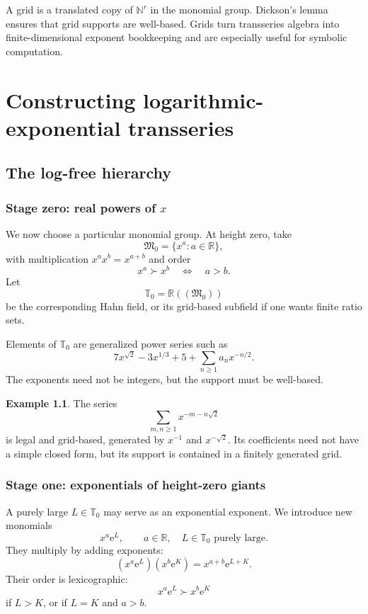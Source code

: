 \documentclass[11pt,oneside]{book}
\theoremstyle{definition}
\newtheorem{example}[theorem]{Example}
\theoremstyle{remark}
\newcommand{\R}{\mathbb{R}}
\newcommand{\N}{\mathbb{N}}
\newcommand{\T}{\mathbb{T}}
\newcommand{\M}{\mathfrak{M}}
\newcommand{\e}{\mathrm{e}}
\newcommand{\succdom}{\succ}
\begin{document}
\begin{summarybox}
A grid is a translated copy of $\N^r$ in the monomial group. Dickson's lemma
ensures that grid supports are well-based. Grids turn transseries algebra into
finite-dimensional exponent bookkeeping and are especially useful for symbolic
computation.
\end{summarybox}


\part{Constructing logarithmic-exponential transseries}

\chapter{The log-free hierarchy}
\label{ch:logfree-hierarchy}

\section{Stage zero: real powers of \texorpdfstring{$x$}{x}}

We now choose a particular monomial group. At height zero, take
\[
  \M_0=\{x^a:a\in\R\},
\]
with multiplication $x^ax^b=x^{a+b}$ and order
\[
  x^a\succdom x^b \quad\Longleftrightarrow\quad a>b.
\]
Let
\[
  \T_0=\R((\M_0))
\]
be the corresponding Hahn field, or its grid-based subfield if one wants finite
ratio sets.

Elements of $\T_0$ are generalized power series such as
\[
  7x^{\sqrt2}-3x^{1/3}+5+\sum_{n\ge1}a_nx^{-n/2}.
\]
The exponents need not be integers, but the support must be well-based.

\begin{example}
The series
\[
  \sum_{m,n\ge1}x^{-m-n\sqrt2}
\]
is legal and grid-based, generated by $x^{-1}$ and $x^{-\sqrt2}$. Its
coefficients need not have a simple closed form, but its support is contained in
a finitely generated grid.
\end{example}

\section{Stage one: exponentials of height-zero giants}

A purely large $L\in\T_0$ may serve as an exponential exponent. We introduce
new monomials
\[
  x^a\e^L,
  \qquad a\in\R,
  \quad L\in\T_0\text{ purely large}.
\]
They multiply by adding exponents:
\[
  (x^a\e^L)(x^b\e^K)=x^{a+b}\e^{L+K}.
\]
Their order is lexicographic:
\[
  x^a\e^L\succdom x^b\e^K
\]
if $L>K$, or if $L=K$ and $a>b$.
\end{document}
